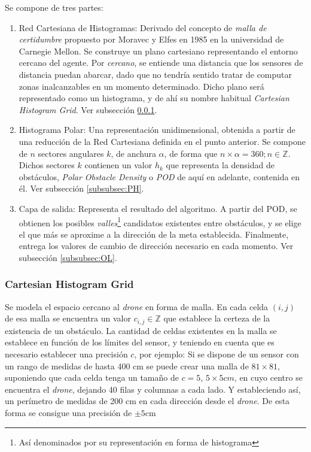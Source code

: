 Se compone de tres partes: 
\begin{enumerate}
\item Red Cartesiana de Histogramas: Derivado del concepto de \textit{malla de certidumbre} propuesto por Moravec y Elfes en 1985 \citep{conf:CertainityGrid}  en la universidad de Carnegie Mellon. Se construye un plano cartesiano representando el entorno cercano del agente. Por \textit{cercano}, se entiende una distancia que los sensores de distancia puedan abarcar, dado que no tendría sentido tratar de computar zonas inalcanzables en un momento determinado. Dicho plano será representado como un histograma, y de ahí su nombre habitual \textit{Cartesian Histogram Grid}. Ver subsección \ref{subsubsec:CHG}.
\item Histograma Polar: Una representación unidimensional, obtenida a partir de una reducción de la Red Cartesiana definida en el punto anterior. Se compone de $n$ sectores angulares $k$, de anchura $\alpha$, de forma que $n \times \alpha = 360; n \in \mathbb{Z}$. Dichos sectores $k$ contienen un valor $h_k$ que representa la densidad de obstáculos, \textit{Polar Obstacle Density} o \textit{POD} de aquí en adelante, contenida en él. Ver subsección \ref{subsubsec:PH}.
\item Capa de salida: Representa el resultado del algoritmo. A partir del POD, se obtienen los posibles \textit{valles}\footnote{Así denominados por su representación en forma de histograma} candidatos existentes entre obstáculos, y se elige el que más se aproxime a la dirección de la meta establecida. Finalmente, entrega los valores de cambio de dirección necesario en cada momento. Ver subsección \ref{subsubsec:OL}.
\end{enumerate}

\subsubsection{Cartesian Histogram Grid}
\label{subsubsec:CHG}
Se modela el espacio cercano al \emph{drone} en forma de malla. En cada celda $(i,j)$ de esa malla se encuentra un valor $c_{i,j} \in \mathbb{Z}$ que establece la certeza de la existencia de un obstáculo. La cantidad de celdas existentes en la malla se establece en función de los límites del sensor, y teniendo en cuenta que es necesario establecer una precisión $c$, por ejemplo: Si se dispone de un sensor con un rango de medidas de hasta 400 cm se puede crear una malla de $81\times 81$, suponiendo que cada celda tenga un tamaño de $c=5$, $5 \times 5cm$, en cuyo centro se encuentra el \emph{drone}, dejando 40 filas y columnas a cada lado. Y estableciendo así, un perímetro de medidas de 200 cm en cada dirección desde el \emph{drone}. De esta forma se consigue una precisión de $\pm5\text{cm}$

